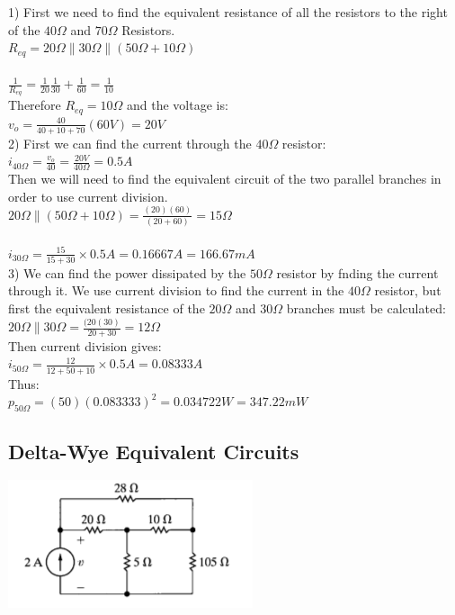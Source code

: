 1) First we need to find the equivalent resistance of all the resistors to the right of the $40 \Omega$
and $70 \Omega$ Resistors. 
\\$R_{eq} = 20\Omega \parallel 30\Omega \parallel (50 \Omega + 10 \Omega) $\\
\\$ \frac{1}{R_{eq}} = \frac{1}{20} \frac{1}{30} + \frac{1}{60} = \frac{1}{10} $\\
Therefore $R_{eq} = 10 \Omega$ and the voltage is:
\\$ v_o = \frac{40}{40+10+70}(60 V) = 20 V $\\


2) First we can find the current through the $40\Omega$ resistor:
\\ $ i_{40\Omega} = \frac{v_o}{40} = \frac{20 V}{40\Omega} = 0.5 A $ \\

Then we will need to find the equivalent circuit of the two parallel branches in order to use
current division. 
\\ $20 \Omega \parallel(50 \Omega + 10 \Omega) = \frac{(20)(60)}{(20+60)} = 15 \Omega $ \\
\\ $i_{30 \Omega} = \frac{15}{15+30} \times 0.5A = 0.16667 A = 166.67 mA $ \\

3) We can find the power dissipated by the $50 \Omega$ resistor by fnding the current through it. 
We use current division to find the current in the $40 \Omega$ resistor, but first the equivalent 
resistance of the $20 \Omega$ and $30 \Omega$ branches must be calculated:
\\$ 20 \Omega \parallel 30\Omega = \frac{(20(30)}{20+30} = 12 \Omega $\\
Then current division gives:
\\$ i_{50\Omega} = \frac{12}{12+50+10} \times 0.5A = 0.08333A $\\
Thus:
\\ $p_{50\Omega} = (50)(0.083333)^2 = 0.034722 W = 347.22 mW $ \\


\subsection{Delta-Wye Equivalent Circuits}
\includegraphics{img/c3/p4}

